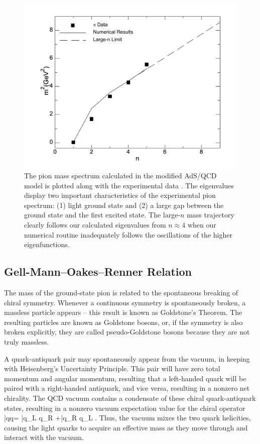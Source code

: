 \begin{figure}[htb]
\begin{center}
\includegraphics[scale=0.42]{linear.pdf}
\caption{The pion mass spectrum calculated in the modified AdS/QCD model is plotted along with the experimental data \cite{PDG}. 
The eigenvalues display two important characteristics of the experimental pion spectrum: (1) light ground state and (2) a large gap between the ground state and the first excited state. 
The large-$n$ mass trajectory clearly follows our calculated eigenvalues from $n\approx 4$ when our numerical routine inadequately follows the oscillations of the higher eigenfunctions.}
\label{fig:mass}
\end{center}
\end{figure}

\subsection{Gell-Mann--Oakes--Renner Relation}
The mass of the ground-state pion is related to the spontaneous breaking of chiral symmetry.
Whenever a continuous symmetry is spontaneously broken, a massless particle appears -- this result is known as Goldstone's Theorem.
The resulting particles are known as Goldstone bosons, or, if the symmetry is also broken explicitly, they are called pseudo-Goldstone bosons because they are not truly massless.
 
 A quark-antiquark pair may spontaneously appear from the vacuum, in keeping with Heisenberg's Uncertainty Principle. 
 This pair will have zero total momentum and angular momentum, resulting that a left-handed quark will be paired with a right-handed antiquark, and vice versa, resulting in a nonzero net chirality.
 The QCD vacuum contains a condensate of these chiral quark-antiquark states, resulting in a nonzero vacuum expectation value for the chiral operator
 \be
 \langle\bar{q}q\rangle = \langle \bar{q}_L q_R +\bar{q}_R q_L \rangle {}.
 \ee
 Thus, the vacuum mixes the two quark helicities, causing the light quarks to acquire an effective mass as they move through and interact with the vacuum.
 
